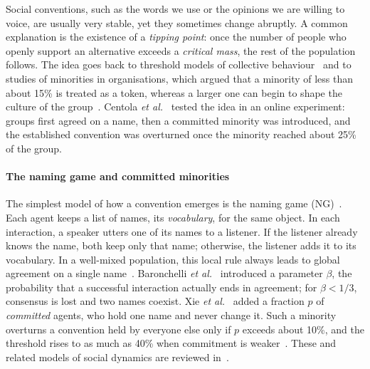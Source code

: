 \documentclass[9pt,twoside]{pnas-new}
\begin{document}
Social conventions, such as the words we use or the opinions we are willing to
voice, are usually very stable, yet they sometimes change abruptly. A common
explanation is the existence of a \emph{tipping point}: once the number of
people who openly support an alternative exceeds a \emph{critical mass}, the
rest of the population follows. The idea goes back to threshold models of
collective behaviour~\cite{granovetter1978threshold} and to studies of
minorities in organisations, which argued that a minority of less than about
15\% is treated as a token, whereas a larger one can begin to shape the culture
of the group~\cite{kanter1977some}. Centola
\emph{et al.}~\cite{centola2018experimental} tested the idea in an online
experiment: groups first agreed on a name, then a committed minority was
introduced, and the established convention was overturned once the minority
reached about 25\% of the group.

\paragraph*{The naming game and committed minorities}
The simplest model of how a convention emerges is the naming game
(NG)~\cite{steels1995self,baronchelli2006sharp}. Each agent keeps a list of
names, its \emph{vocabulary}, for the same object. In each interaction, a
speaker utters one of its names to a listener. If the listener already knows
the name, both keep only that name; otherwise, the listener adds it to its
vocabulary. In a well-mixed population, this local rule always leads to global
agreement on a single name~\cite{baronchelli2006sharp}.
Baronchelli \emph{et al.}~\cite{baronchelli2007nonequilibrium} introduced a
parameter $\beta$, the probability that a successful interaction actually ends
in agreement; for $\beta<1/3$, consensus is lost and two names coexist.
Xie \emph{et al.}~\cite{xie2011social} added a fraction $p$ of
\emph{committed} agents, who hold one name and never change it. Such a
minority overturns a convention held by everyone else only if $p$ exceeds about
10\%, and the threshold rises to as much as 40\% when commitment is
weaker~\cite{niu2017impact}. These and related models of social dynamics are
reviewed in~\cite{castellano2009statistical}.
\end{document}
